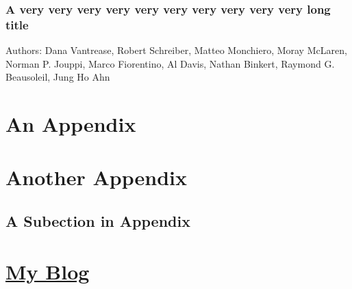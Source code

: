 \documentclass[11pt]{article}
\newcommand\myBlogUrl{http://schenax.student.ust.hk}
\begin{document}
\blindtext

\subsubsection{A very very very very very very very very very very long title \texorpdfstring{\hyperref[tab:literature]{\footnotesize \hfill{}}}{}}
\label{lit:labelOfYourSubsubsection5}		%
{
	\tiny
	Authors: Dana Vantrease, Robert Schreiber, Matteo Monchiero, Moray McLaren, Norman P. Jouppi, Marco Fiorentino, Al Davis, Nathan Binkert, Raymond G. Beausoleil, Jung Ho Ahn \cite{Something}
	\par  %
}

\cite{Pan, Something, HK, Boney96}
\blindtext


\newpage
\begin{appendices}
	\section{An Appendix}

	


	\section{Another Appendix}
	
	\subsection{A Subection in Appendix}
	
	\section{\href{\myBlogUrl}{\noindent My Blog \texorpdfstring{\small {}}{}}}
	
\end{appendices}
\end{document}
